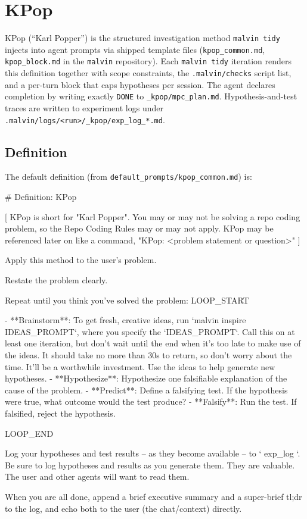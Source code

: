 \documentclass[11pt]{article}
\begin{document}
\section{KPop}
\label{app:kpop}

KPop (``Karl Popper'') is the structured investigation method \texttt{malvin tidy} injects into agent prompts via shipped template files (\texttt{kpop\_common.md}, \texttt{kpop\_block.md} in the \texttt{malvin} repository). Each \texttt{malvin tidy} iteration renders this definition together with scope constraints, the \texttt{.malvin/checks} script list, and a per-turn block that caps hypotheses per session. The agent declares completion by writing exactly \texttt{DONE} to \texttt{\_kpop/mpc\_plan.md}. Hypothesis-and-test traces are written to experiment logs under \texttt{.malvin/logs/<run>/\_kpop/exp\_log\_*.md}.

\subsection{Definition}

The default definition (from \texttt{default\_prompts/kpop\_common.md}) is:

\begin{kpopdef}
# Definition: KPop

[
KPop is short for "Karl Popper".
You may or may not be solving a repo coding problem, so the Repo Coding Rules may or may not apply.
KPop may be referenced later on like a command, "KPop: <problem statement or question>"
]

Apply this method to the user's problem.

Restate the problem clearly.

Repeat until you think you've solved the problem:
LOOP_START

- **Brainstorm**: To get fresh, creative ideas, run `malvin inspire IDEAS_PROMPT`, where you specify the `IDEAS_PROMPT`. Call this on at least one iteration, but don't wait until the end when it's too late to make use of the ideas.
                  It should take no more than 30s to return, so don't worry about the time. It'll be a worthwhile investment. Use the ideas to help generate new hypotheses.
- **Hypothesize**: Hypothesize one falsifiable explanation of the cause of the problem.
- **Predict**: Define a falsifying test. If the hypothesis were true, what outcome would the test produce?
- **Falsify**: Run the test. If falsified, reject the hypothesis.

LOOP_END

Log your hypotheses and test results -- as they become available -- to `{{ exp_log }}`. Be sure to log hypotheses and results
as you generate them. They are valuable. The user and other agents will want to read them.

When you are all done, append a brief executive summary and a super-brief tl;dr to the log, and echo both to the user (the chat/context) directly.
\end{kpopdef}
\end{document}
